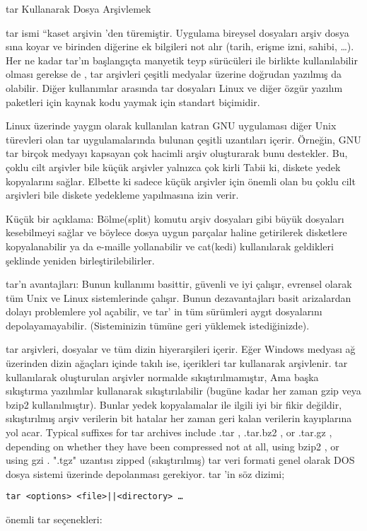 \begin{section}{tar Kullanarak Dosya Arşivlemek}

tar ismi “kaset arşivin ’den türemiştir. Uygulama bireysel dosyaları arşiv dosya sına koyar ve birinden diğerine ek bilgileri not alır (tarih, erişme izni, sahibi, …). Her ne kadar tar’ın başlangıçta manyetik teyp sürücüleri ile birlikte kullanılabilir olması gerekse de , tar arşivleri çeşitli medyalar üzerine doğrudan yazılmış da olabilir. Diğer kullanımlar arasında tar dosyaları Linux ve diğer özgür yazılım paketleri için kaynak kodu yaymak için standart biçimidir.

Linux üzerinde yaygın olarak kullanılan katran GNU uygulaması diğer Unix türevleri olan tar uygulamalarında bulunan çeşitli uzantıları içerir. Örneğin, GNU tar birçok medyayı kapsayan çok hacimli arşiv oluşturarak bunu destekler. Bu, çoklu cilt arşivler bile küçük arşivler yalnızca çok kirli Tabii ki, diskete yedek kopyalarını sağlar. Elbette ki sadece küçük arşivler için önemli olan bu çoklu cilt arşivleri bile diskete yedekleme yapılmasına izin verir.

Küçük bir açıklama: Bölme(split) komutu arşiv dosyaları gibi büyük dosyaları kesebilmeyi sağlar ve böylece dosya uygun parçalar haline getirilerek disketlere kopyalanabilir ya da e-maille yollanabilir ve cat(kedi) kullanılarak geldikleri şeklinde yeniden birleştirilebilirler.

tar’n avantajları: Bunun kullanımı basittir, güvenli ve iyi çalışır, evrensel olarak tüm Unix ve Linux sistemlerinde çalışır. Bunun dezavantajları basit arizalardan dolayı problemlere yol açabilir, ve  tar’ in tüm sürümleri aygıt dosyalarını depolayamayabilir. (Sisteminizin tümüne geri yüklemek istediğinizde).

tar arşivleri, dosyalar ve tüm dizin hiyerarşileri içerir. Eğer Windows medyası ağ üzerinden dizin ağaçları içinde takılı ise, içerikleri tar kullanarak arşivlenir. tar kullanılarak oluşturulan arşivler normalde sıkıştırılmamıştır, Ama başka sıkıştırma yazılımlar kullanarak sıkıştırılabilir (bugüne kadar her zaman gzip veya bzip2 kullanılmıştır). Bunlar yedek kopyalamalar ile ilgili iyi bir fikir değildir, sıkıştırılmış arşiv verilerin bit hatalar her zaman geri kalan verilerin kayıplarına yol acar. Typical suffixes for tar archives include .tar , .tar.bz2 , or .tar.gz , depending on whether they have been compressed not at all, using bzip2 , or using gzi . ".tgz" uzantısı zipped (sıkıştırılmış) tar veri formati genel olarak DOS dosya sistemi üzerinde depolanması gerekiyor. tar ’in söz dizimi;
\begin{verbatim}
tar <options> <file>||<directory> …
\end{verbatim}
önemli tar seçenekleri:


\end{section}
